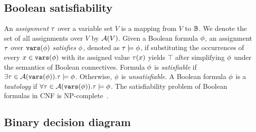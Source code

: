 \subsection{Boolean satisfiability}
An \textit{assignment} $\tau$ over a variable set $V$ is a mapping from $V$ to $\mathbb{B}$.
We denote the set of all assignments over $V$ by $\mathcal{A}(V)$.
Given a Boolean formula $\phi$, an assignment $\tau$ over $\mathtt{vars}(\phi)$ \textit{satisfies} $\phi$,
denoted as $\tau\models\phi$,
if substituting the occurrences of every $x\in\mathtt{vars}(\phi)$ with its assigned value $\tau(x)$ yields $\top$
after simplifying $\phi$ under the semantics of Boolean connectives.
Formula $\phi$ is \textit{satisfiable} if $\exists\tau\in\mathcal{A}(\mathtt{vars}(\phi)).\tau\models\phi$.
Otherwise, $\phi$ is \textit{unsatisfiable}.
A Boolean formula $\phi$ is a \textit{tautology} if $\forall\tau\in\mathcal{A}(\mathtt{vars}(\phi)).\tau\models\phi$.
The satisfiability problem of Boolean formulas in CNF is NP-complete~\cite{Cook1971}.

\subsection{Binary decision diagram}